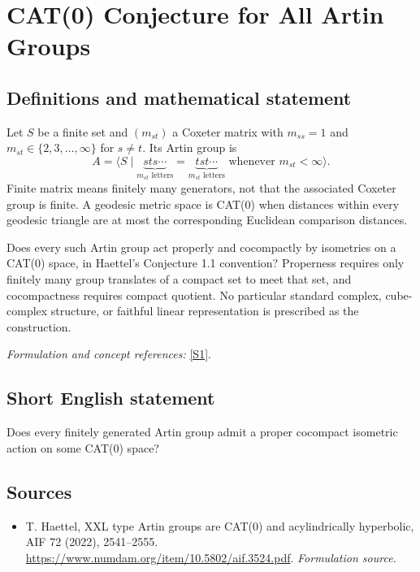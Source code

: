 \documentclass[11pt]{article}
\begin{document}
\section*{\texorpdfstring{CAT(0) Conjecture for All Artin Groups}{CAT(0) Conjecture for All Artin Groups}}\label{500}
\subsection{Definitions and mathematical statement}
Let $S$ be a finite set and $(m_{st})$ a Coxeter matrix with $m_{ss}=1$ and $m_{st}\in\{2,3,\ldots,\infty\}$ for $s\ne t$. Its Artin group is
\[
 A=\langle S\mid
 \underbrace{sts\cdots}_{m_{st}\text{ letters}}=
 \underbrace{tst\cdots}_{m_{st}\text{ letters}}
 \text{ whenever }m_{st}<\infty\rangle.
\]
Finite matrix means finitely many generators, not that the associated Coxeter group is finite. A geodesic metric space is CAT(0) when distances within every geodesic triangle are at most the corresponding Euclidean comparison distances.

Does every such Artin group act properly and cocompactly by isometries on a CAT(0) space, in Haettel's Conjecture 1.1 convention? Properness requires only finitely many group translates of a compact set to meet that set, and cocompactness requires compact quotient. No particular standard complex, cube-complex structure, or faithful linear representation is prescribed as the construction.
\par\smallskip\textit{Formulation and concept references:} \href{https://www.numdam.org/item/10.5802/aif.3524.pdf}{[S1]}.

\subsection{Short English statement}
Does every finitely generated Artin group admit a proper cocompact isometric action on some CAT(0) space?
\subsection{Sources}
\begin{itemize}
\item[S1]T. Haettel, XXL type Artin groups are CAT(0) and acylindrically hyperbolic, AIF 72 (2022), 2541–2555.
\url{https://www.numdam.org/item/10.5802/aif.3524.pdf}.
\textit{Formulation source.}
\end{itemize}
\end{document}
